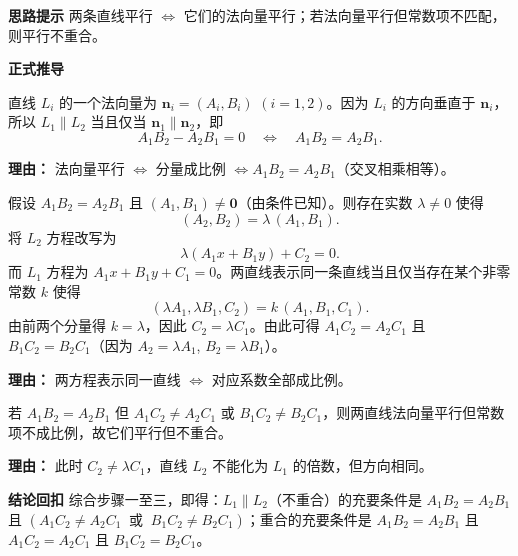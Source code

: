 \begin{proofbox}
	\textbf{\textcolor{CProof}{思路提示}}
	两条直线平行 $\iff$ 它们的法向量平行；若法向量平行但常数项不匹配，则平行不重合。

	\medskip
	\textbf{\textcolor{CProof}{正式推导}}
	\begin{description}[style=nextline, leftmargin=2.8em, labelsep=0.5em, itemsep=0.55em]
		\item[\textbf{步骤一（法向量共线）：}]
			直线 $L_i$ 的一个法向量为 $\mathbf{n}_i=(A_i,B_i)$ $(i=1,2)$。因为 $L_i$ 的方向垂直于 $\mathbf{n}_i$，所以 $L_1\parallel L_2$ 当且仅当 $\mathbf{n}_1\parallel\mathbf{n}_2$，即
			\[
				A_1B_2 - A_2B_1 = 0 \quad\iff\quad A_1B_2 = A_2B_1.
			\]
			\par\textbf{理由：} 法向量平行 $\iff$ 分量成比例 $\iff A_1B_2 = A_2B_1$（交叉相乘相等）。
		\item[\textbf{步骤二（重合的条件）：}]
			假设 $A_1B_2 = A_2B_1$ 且 $(A_1,B_1)\neq\mathbf{0}$（由条件已知）。则存在实数 $\lambda\neq0$ 使得
			\[
				(A_2,B_2) = \lambda\,(A_1,B_1).
			\]
			将 $L_2$ 方程改写为
			\[
				\lambda(A_1x+B_1y) + C_2 = 0.
			\]
			而 $L_1$ 方程为 $A_1x+B_1y+C_1=0$。两直线表示同一条直线当且仅当存在某个非零常数 $k$ 使得
			\[
				(\lambda A_1,\lambda B_1,C_2) = k\,(A_1,B_1,C_1).
			\]
			由前两个分量得 $k=\lambda$，因此 $C_2 = \lambda C_1$。由此可得 $A_1C_2 = A_2C_1$ 且 $B_1C_2 = B_2C_1$（因为 $A_2=\lambda A_1$, $B_2=\lambda B_1$）。
			\par\textbf{理由：} 两方程表示同一直线 $\iff$ 对应系数全部成比例。
		\item[\textbf{步骤三（平行非重合）：}]
			若 $A_1B_2 = A_2B_1$ 但 $A_1C_2 \neq A_2C_1$ 或 $B_1C_2 \neq B_2C_1$，则两直线法向量平行但常数项不成比例，故它们平行但不重合。
			\par\textbf{理由：} 此时 $C_2 \neq \lambda C_1$，直线 $L_2$ 不能化为 $L_1$ 的倍数，但方向相同。
	\end{description}

	\medskip
	\textbf{\textcolor{CProof}{结论回扣}}
	综合步骤一至三，即得：$L_1\parallel L_2$（不重合）的充要条件是 $A_1B_2 = A_2B_1$ 且 $(A_1C_2 \neq A_2C_1\ \text{ 或 }\ B_1C_2 \neq B_2C_1)$；重合的充要条件是 $A_1B_2 = A_2B_1$ 且 $A_1C_2 = A_2C_1$ 且 $B_1C_2 = B_2C_1$。
\end{proofbox}
